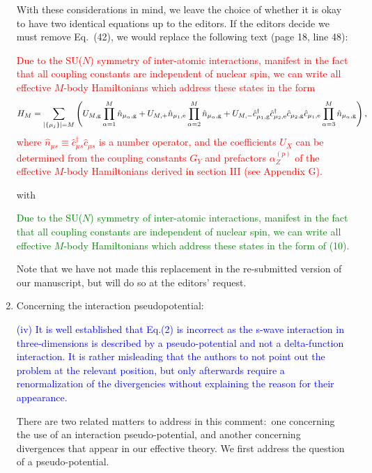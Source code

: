 \documentclass[preprint]{revtex4-1}
\newcommand{\p}[1]{\left(#1\right)} %
\renewcommand{\set}[1]{\left\{#1\right\}} %
\newcommand{\g}{\text{g}}
\newcommand{\e}{\text{e}}
\renewcommand{\c}{\hat{c}}
\newcommand{\n}{\hat{n}}
\newcommand{\1}{\mathds{1}}
\newcommand{\blue}[1]{\textcolor{blue}{#1}}
\newcommand{\red}[1]{\textcolor{red}{#1}}
\newcommand{\green}[1]{\textcolor{green}{#1}}
\begin{document}
\begin{enumerate}
  With these considerations in mind, we leave the choice of whether it
  is okay to have two identical equations up to the editors.  If the
  editors decide we must remove Eq.~(42), we would replace the
  following text (page 18, line 48):

  \red{Due to the SU($N$) symmetry of inter-atomic interactions,
    manifest in the fact that all coupling constants are independent
    of nuclear spin, we can write all effective $M$-body Hamiltonians
    which address these states in the form
    \begin{align}
      H_M = \sum_{\abs{\set{\mu_j}}=M}
      \p{U_{M,\g} \prod_{\alpha=1}^M \n_{\mu_\alpha,\g}
        + U_{M,+} \n_{\mu_1,\e} \prod_{\alpha=2}^M \n_{\mu_\alpha,\g}
        + U_{M,-} \c_{\mu_1,\g}^\dag \c_{\mu_2,\e}^\dag
        \c_{\mu_2,\g} \c_{\mu_1,\e} \prod_{\alpha=3}^M \n_{\mu_\alpha,\g}},
    \end{align}
    where $\n_{\mu s}\equiv \c_{\mu s}^\dag\c_{\mu s}$ is a number
    operator, and the coefficients $U_X$ can be determined from the
    coupling constants $G_Y$ and prefactors $\alpha_Z^{(p)}$ of the
    effective $M$-body Hamiltonians derived in section III (see
    Appendix G).}

  with

  \green{Due to the SU($N$) symmetry of inter-atomic interactions,
    manifest in the fact that all coupling constants are independent
    of nuclear spin, we can write all effective $M$-body Hamiltonians
    which address these states in the form of (10).}

  Note that we have not made this replacement in the re-submitted
  version of our manuscript, but will do so at the editors' request.


\item Concerning the interaction pseudopotential:

  \blue{(iv) It is well established that Eq.(2) is incorrect as the
    s-wave interaction in three-dimensions is described by a
    pseudo-potential and not a delta-function interaction. It is
    rather misleading that the authors to not point out the problem at
    the relevant position, but only afterwards require a
    renormalization of the divergencies without explaining the reason
    for their appearance.}

  There are two related matters to address in this comment:~one
  concerning the use of an interaction pseudo-potential, and another
  concerning divergences that appear in our effective theory.  We
  first address the question of a pseudo-potential.


\end{enumerate}
\end{document}
